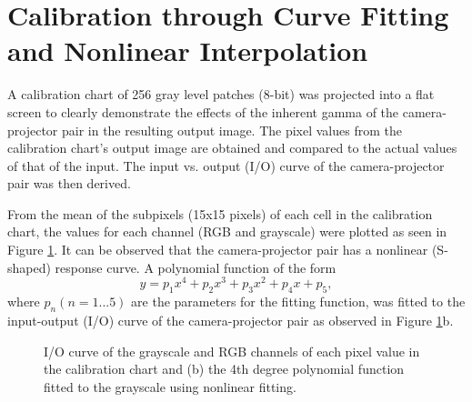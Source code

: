 \section{Calibration through Curve Fitting and Nonlinear Interpolation}

A calibration chart of 256 gray level patches (8-bit) was projected into a flat screen to clearly demonstrate the effects of the inherent gamma of the camera-projector pair in the resulting output image. 
The pixel values from the calibration chart's output image are obtained and compared to the actual values of that of the input. 
The input vs. output (I/O) curve of the camera-projector pair was then derived.
 
From the mean of the subpixels (15x15 pixels) of each cell in the calibration chart, the values for each channel (RGB and grayscale) were plotted as seen in Figure \ref{fig:IO_fit}. It can be observed that the camera-projector pair has a nonlinear (S-shaped) response curve. A polynomial function of the form
\begin{equation}
y = p_1x^4 + p_2x^3 + p_3x^2 + p_4x + p_5,
\label{eq:poly}
\end{equation}
where $p_n (n = 1...5)$ are the parameters for the fitting function, was fitted to the input-output (I/O) curve of the camera-projector pair as observed in Figure \ref{fig:IO_fit}b. 

\captionsetup[figure]{width=5in}
\begin{figure}[h!t]
	\centering
	\caption[Input-output curve of the calibration chart]{ I/O curve of the grayscale and RGB channels of each pixel value in the calibration chart and (b) the 4th degree polynomial function fitted to the grayscale using nonlinear fitting.}
	\label{fig:IO_fit}
\end{figure}


